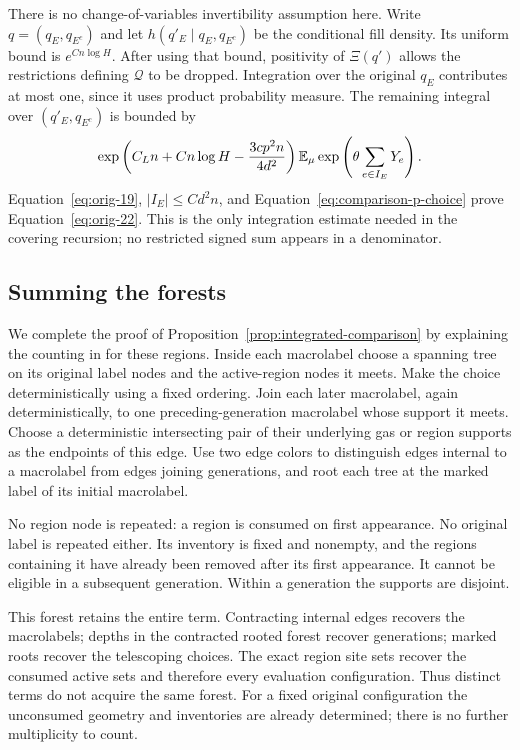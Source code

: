 There is no change-of-variables invertibility assumption here.
Write $q=(q_E,q_{E^c})$ and let
$h(q'_E\mid q_E,q_{E^c})$ be the conditional fill density. Its
uniform bound is $e^{Cn\log H}$. After using that bound, positivity
of $\Xi(q')$ allows the restrictions defining $\mathcal Q$ to be
dropped. Integration over the original $q_E$ contributes at most
one, since it uses product probability measure. The remaining
integral over $(q'_E,q_{E^c})$ is bounded by
\[
 \exp\left(C_Ln+Cn\log H-\frac{3cp^2n}{4d^2}\right)
 \mathbb E_\mu\exp\left(\theta\sum_{e\in I_E}Y_e\right).
\]
Equation~\eqref{eq:orig-19}, $|I_E|\le Cd^2n$, and
Equation~\eqref{eq:comparison-p-choice} prove
Equation~\eqref{eq:orig-22}. This is the only integration estimate
needed in the covering recursion; no restricted signed sum appears
in a denominator.

\subsection{Summing the forests}

We complete the proof of Proposition~\ref{prop:integrated-comparison}
by explaining the counting in  for these regions.
Inside each macrolabel choose a spanning tree on its original label
nodes and the active-region nodes it meets. Make the choice
deterministically using a fixed ordering. Join each later macrolabel,
again deterministically, to one preceding-generation macrolabel whose
support it meets. Choose a deterministic intersecting pair of their
underlying gas or region supports as the endpoints of this edge. Use
two edge colors to distinguish edges internal
to a macrolabel from edges joining generations, and root each tree
at the marked label of its initial macrolabel.

No region node is repeated: a region is consumed on first appearance.
No original label is repeated either. Its inventory is fixed and
nonempty, and the regions containing it have already been removed
after its first appearance. It cannot be eligible in a subsequent
generation. Within a generation the supports are disjoint.

This forest retains the entire term. Contracting internal edges
recovers the macrolabels; depths in the contracted rooted forest
recover generations; marked roots recover the telescoping choices.
The exact region site sets recover the consumed active sets and
therefore every evaluation configuration. Thus distinct terms do
not acquire the same forest. For a fixed original configuration the
unconsumed geometry and inventories are already determined; there
is no further multiplicity to count.

